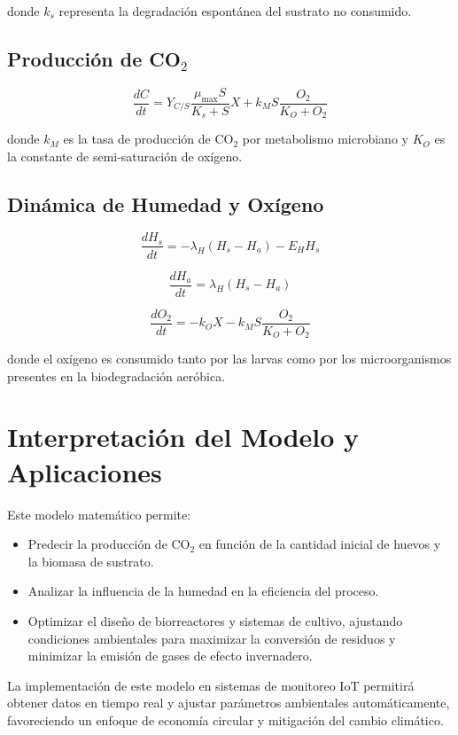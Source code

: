 \documentclass{article}
\begin{document}
donde $k_s$ representa la degradación espontánea del sustrato no consumido.

\subsection{Producción de CO$_2$}
\begin{equation}
    \frac{dC}{dt} = Y_{C/S} \frac{\mu_{\max} S}{K_s + S} X + k_M S \frac{O_2}{K_O + O_2}
\end{equation}

donde $k_M$ es la tasa de producción de CO$_2$ por metabolismo microbiano y $K_O$ es la constante de semi-saturación de oxígeno.

\subsection{Dinámica de Humedad y Oxígeno}
\begin{equation}
    \frac{dH_s}{dt} = -\lambda_H (H_s - H_a) - E_H H_s
\end{equation}

\begin{equation}
    \frac{dH_a}{dt} = \lambda_H (H_s - H_a)
\end{equation}

\begin{equation}
    \frac{dO_2}{dt} = -k_O X - k_M S \frac{O_2}{K_O + O_2}
\end{equation}

donde el oxígeno es consumido tanto por las larvas como por los microorganismos presentes en la biodegradación aeróbica.

\section{Interpretación del Modelo y Aplicaciones}
Este modelo matemático permite:
\begin{itemize}
    \item Predecir la producción de CO$_2$ en función de la cantidad inicial de huevos y la biomasa de sustrato.
    \item Analizar la influencia de la humedad en la eficiencia del proceso.
    \item Optimizar el diseño de biorreactores y sistemas de cultivo, ajustando condiciones ambientales para maximizar la conversión de residuos y minimizar la emisión de gases de efecto invernadero.
\end{itemize}

La implementación de este modelo en sistemas de monitoreo IoT permitirá obtener datos en tiempo real y ajustar parámetros ambientales automáticamente, favoreciendo un enfoque de economía circular y mitigación del cambio climático.



\end{document}
